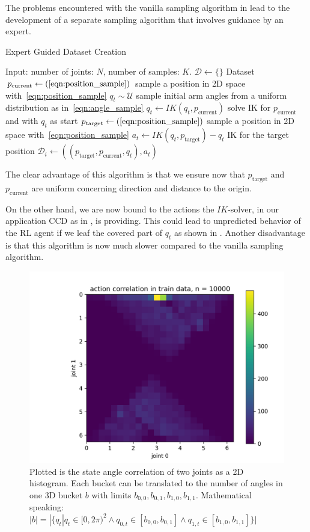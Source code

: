 The problems encountered with the vanilla sampling algorithm in  lead to the development of a separate sampling algorithm that involves guidance by an expert. 

\begin{algorithm}
    \caption{Expert Guided Dataset Creation}\label{alg:Expert_Dataset}
    \begin{algorithmic}
        \State{} Input: number of joints: $N$, number of samples: $K$.
        \State{} $\mathcal{D} \leftarrow \{\}$  Dataset
            \State{} $p_{\text{current}} \leftarrow (\text{\ref{eqn:position_sample}})$ sample a position in 2D space with~\eqref{eqn:position_sample}
            \State{} $q_t \sim \mathcal{U}$ sample initial arm angles from a uniform distribution as in~\eqref{eqn:angle_sample}
            \State{} $q_t \leftarrow IK(q_t, p_{\text{current}})$ solve IK for $p_{\text{current}}$ and with $q_t$ as start
            \State{} $p_{\text{target}} \leftarrow (\text{\ref{eqn:position_sample}})$ sample a position in 2D space with~\eqref{eqn:position_sample}
            \State{} $a_t \leftarrow IK(q_t, p_{\text{target}}) - q_t$ IK for the target position
            \State{} $\mathcal{D}_i \leftarrow ((p_{\text{target}}, p_{\text{current}}, q_t), a_t)$
        \EndFor{}
\end{algorithmic}
\end{algorithm}
The clear advantage of this algorithm is that we ensure now that $p_{\text{target}}$ and $p_{\text{current}}$ are uniform concerning direction and distance to the origin.

On the other hand, we are now bound to the actions the $IK$-solver, in our application CCD as in , is providing. This could lead to unpredicted behavior of the RL agent if we leaf the covered part of $q_t$ as shown in . Another disadvantage is that this algorithm is now much slower compared to the vanilla sampling algorithm. 
\begin{figure}
    \begin{center}
        \includegraphics[width=0.46 \linewidth]{figures/methodology/dataset/action_correlation.png}
    \end{center}
    \caption[action correlation CCD]{Plotted is the state angle correlation of two joints as a 2D histogram. Each bucket can be translated to the number of angles in one 3D bucket $b$ with limits $b_{0, 0}, b_{0, 1}, b_{1, 0}, b_{1, 1}$. Mathematical speaking: $|b| = |\{q_t | q_t \in [0, 2\pi)^2 \land q_{0, t} \in [b_{0, 0}, b_{0, 1}] \land q_{1, t} \in [b_{1, 0}, b_{1, 1}]\}|$}
    \label{fig:dataset_action_correlation}
\end{figure}

